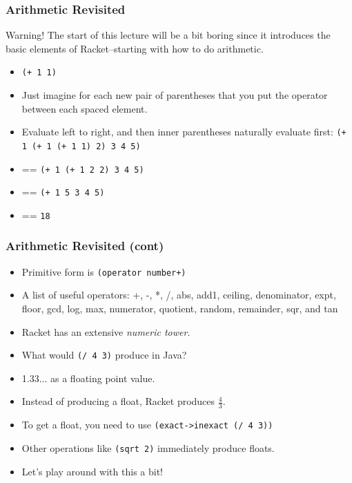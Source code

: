 \documentclass{beamer}
\begin{document}
\begin{frame}
  \frametitle{Arithmetic Revisited}
  Warning! The start of this lecture will be a bit boring since it introduces
  the basic elements of Racket--starting with how to do arithmetic.
  \begin{itemize}
  \item<2-> \texttt{(+ 1 1)}
  \item<3-> Just imagine for each new pair of parentheses that you put the operator
    between each spaced element.
  \item<4-> Evaluate left to right, and then inner parentheses naturally evaluate first: \texttt{(+ 1 (+ 1 (+ 1 1) 2) 3 4 5)}
  \item<5-> == \texttt{(+ 1 (+ 1 2 2) 3 4 5)}
  \item<6-> == \texttt{(+ 1 5 3 4 5)}
  \item<7-> == \texttt{18}
  \end{itemize}
\end{frame}

\begin{frame}
  \frametitle{Arithmetic Revisited (cont)}
  \begin{itemize}
  \item<1-> Primitive form is \texttt{(operator number+)}
  \item<2-> A list of useful operators:  +, -, *, /, abs, add1, ceiling, denominator, expt, floor, gcd, log, max, numerator, quotient, random, remainder, sqr, and tan
  \item<3-> Racket has an extensive \emph{numeric tower}.
  \item<4-> What would \texttt{(/ 4 3)} produce in Java?
  \item<5-> 1.33... as a floating point value.
  \item<6-> Instead of producing a float, Racket produces $\frac{4}{3}$.
  \item<7-> To get a float, you need to use \texttt{(exact->inexact (/ 4 3))}
  \item<8-> Other operations like \texttt{(sqrt 2)} immediately produce floats.
  \item<9-> Let's play around with this a bit!
  \end{itemize}
\end{frame}
\end{document}
